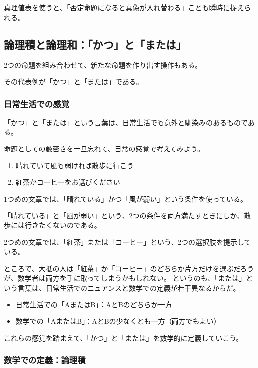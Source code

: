 \documentclass[../../imaging-math]{subfiles}
\begin{document}
真理値表を使うと、「否定命題になると真偽が入れ替わる」ことも瞬時に捉えられる。

\subsection{論理積と論理和：「かつ」と「または」}

2つの命題を組み合わせて、新たな命題を作り出す操作もある。

その代表例が「かつ」と「または」である。

\subsubsection{日常生活での感覚}

「かつ」と「または」という言葉は、日常生活でも意外と馴染みのあるものである。

命題としての厳密さを一旦忘れて、日常の感覚で考えてみよう。

\begin{enumerate}
  \item 晴れていて風も弱ければ散歩に行こう
  \item 紅茶かコーヒーをお選びください
\end{enumerate}

1つめの文章では、「晴れている」かつ「風が弱い」という条件を使っている。

「晴れている」と「風が弱い」という、2つの条件を両方満たすときにしか、散歩には行きたくないのである。

\br

2つめの文章では、「紅茶」または「コーヒー」という、2つの選択肢を提示している。

ところで、大抵の人は「紅茶」か「コーヒー」のどちらか片方だけを選ぶだろうが、数学者は両方を手に取ってしまうかもしれない。
というのも、「または」という言葉は、日常生活でのニュアンスと数学での定義が若干異なるからだ。

\begin{itemize}
  \item 日常生活での「AまたはB」：AとBのどちらか一方
  \item 数学での「AまたはB」：AとBの少なくとも一方（両方でもよい）
\end{itemize}

これらの感覚を踏まえて、「かつ」と「または」を数学的に定義していこう。

\subsubsection{数学での定義：論理積}
\end{document}
